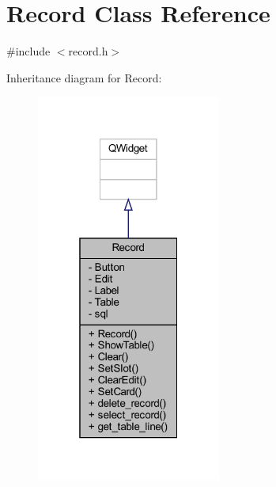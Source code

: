 \hypertarget{class_record}{}\section{Record Class Reference}
\label{class_record}


{\ttfamily \#include $<$record.\+h$>$}



Inheritance diagram for Record\+:
\nopagebreak
\begin{figure}[H]
\begin{center}
\leavevmode
\includegraphics[width=172pt]{class_record__inherit__graph}
\end{center}
\end{figure}


